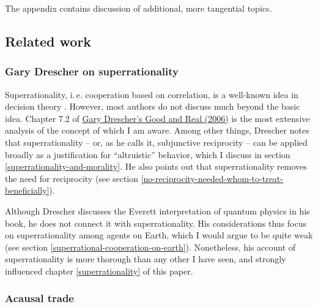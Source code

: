 The appendix contains discussion of additional, more tangential topics.

\hypertarget{related-work}{\subsection{Related
work}\label{related-work}}

\hypertarget{gary-drescher-on-superrationality}{\subsubsection{Gary
Drescher on superrationality}\label{gary-drescher-on-superrationality}}

Superrationality, i.\,e. cooperation based on correlation, is a well-known
idea in decision theory
\parencite{Kuhn2017-tl,Horgan1981-hb,Hofstadter1983-az,Campbell1985-sx,Ahmed2014-ec}.
However, most authors do not discuss much beyond the basic idea. Chapter
7.2 of
\href{https://www.gwern.net/docs/2006-drescher-goodandreal.pdf}{Gary
Drescher's Good and Real (2006)} is the most extensive analysis
of the concept of which I am aware. Among other things, Drescher notes
that superrationality -- or, as he calls it, subjunctive reciprocity --
can be applied broadly as a justification for ``altruistic'' behavior,
which I discuss in section
\ref{superrationality-and-morality}. He also points out that superrationality removes the
need for reciprocity (see section
\ref{no-reciprocity-needed-whom-to-treat-beneficially}).

Although Drescher discusses the Everett interpretation of quantum
physics in his book, he does not connect it with superrationality. His
considerations thus focus on superrationality among agents on Earth,
which I would argue to be quite weak (see section
\ref{superrational-cooperation-on-earth}). Nonetheless, his account of superrationality is more
thorough than any other I have seen, and strongly influenced chapter \ref{superrationality} of this
paper.

\hypertarget{acausal-trade}{\subsubsection{Acausal
trade}\label{acausal-trade}}

